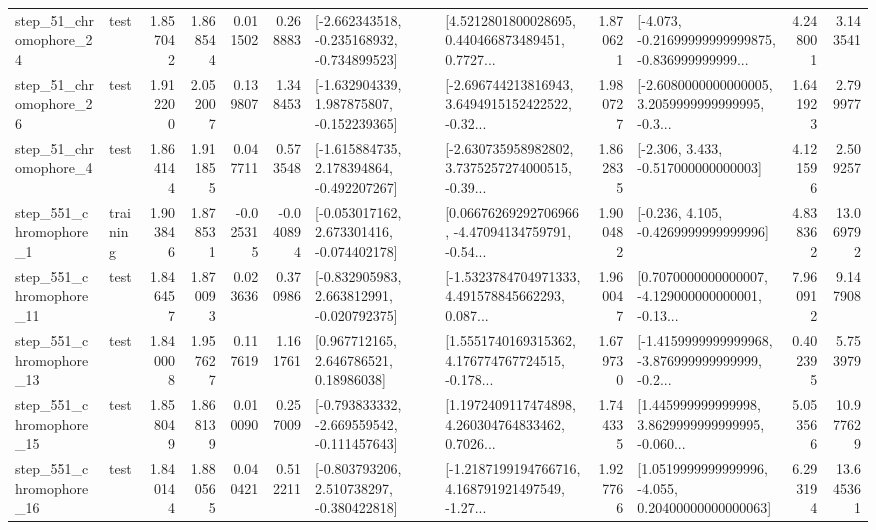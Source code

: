 \begin{tabular}{llrrrrllrlrr}
   step\_51\_chromophore\_24 &      test &      1.857042 &    1.868544 &      0.011502 &  0.268883 &  [-2.662343518, -0.235168932, -0.734899523] &  [4.5212801800028695, 0.440466873489451, 0.7727... &       1.870621 &  [-4.073, -0.21699999999999875, -0.836999999999... &            4.248001 &          3.143541 \\
   step\_51\_chromophore\_26 &      test &      1.912200 &    2.052007 &      0.139807 &  1.348453 &   [-1.632904339, 1.987875807, -0.152239365] &  [-2.696744213816943, 3.6494915152422522, -0.32... &       1.980727 &  [-2.6080000000000005, 3.2059999999999995, -0.3... &            1.641923 &          2.799977 \\
    step\_51\_chromophore\_4 &      test &      1.864144 &    1.911855 &      0.047711 &  0.573548 &   [-1.615884735, 2.178394864, -0.492207267] &  [-2.630735958982802, 3.7375257274000515, -0.39... &       1.862835 &                [-2.306, 3.433, -0.517000000000003] &            4.121596 &          2.509257 \\
   step\_551\_chromophore\_1 &  training &      1.903846 &    1.878531 &     -0.025315 & -0.040894 &   [-0.053017162, 2.673301416, -0.074402178] &  [0.06676269292706966, -4.47094134759791, -0.54... &       1.900482 &               [-0.236, 4.105, -0.4269999999999996] &            4.838362 &         13.069792 \\
  step\_551\_chromophore\_11 &      test &      1.846457 &    1.870093 &      0.023636 &  0.370986 &   [-0.832905983, 2.663812991, -0.020792375] &  [-1.5323784704971333, 4.491578845662293, 0.087... &       1.960047 &  [0.7070000000000007, -4.129000000000001, -0.13... &            7.960912 &          9.147908 \\
  step\_551\_chromophore\_13 &      test &      1.840008 &    1.957627 &      0.117619 &  1.161761 &      [0.967712165, 2.646786521, 0.18986038] &  [1.5551740169315362, 4.176774767724515, -0.178... &       1.679730 &  [-1.4159999999999968, -3.876999999999999, -0.2... &            0.402395 &          5.753979 \\
  step\_551\_chromophore\_15 &      test &      1.858049 &    1.868139 &      0.010090 &  0.257009 &  [-0.793833332, -2.669559542, -0.111457643] &  [1.1972409117474898, 4.260304764833462, 0.7026... &       1.744335 &  [1.445999999999998, 3.8629999999999995, -0.060... &            5.053566 &         10.977629 \\
  step\_551\_chromophore\_16 &      test &      1.840144 &    1.880565 &      0.040421 &  0.512211 &   [-0.803793206, 2.510738297, -0.380422818] &  [-1.2187199194766716, 4.168791921497549, -1.27... &       1.927766 &  [1.0519999999999996, -4.055, 0.20400000000000063] &            6.293194 &         13.645361 \\

\end{tabular}
